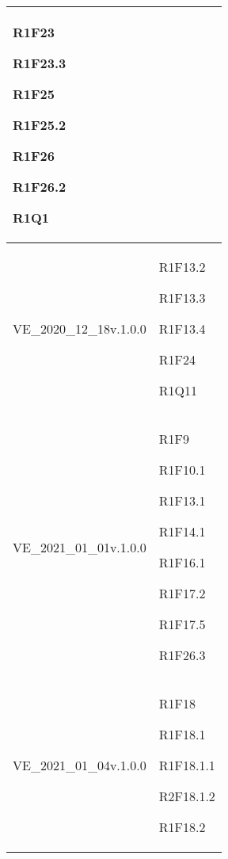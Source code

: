\begin{center}
\begin{longtable}{|p{44mm}|p{22mm}|}
R1F23 \newline

R1F23.3 \newline

R1F25 \newline

R1F25.2 \newline

R1F26 \newline

R1F26.2 \newline

R1Q1 \newline
\\
\hline
VE\_2020\_12\_18v.1.0.0 &

R1F13.2 \newline

R1F13.3 \newline

R1F13.4 \newline

R1F24 \newline

R1Q11 \newline
\\
\hline
VE\_2021\_01\_01v.1.0.0 &

R1F9 \newline

R1F10.1 \newline

R1F13.1 \newline

R1F14.1 \newline

R1F16.1 \newline

R1F17.2 \newline

R1F17.5 \newline

R1F26.3 \newline
\\
\hline
VE\_2021\_01\_04v.1.0.0 &

R1F18 \newline

R1F18.1 \newline

R1F18.1.1 \newline

R2F18.1.2 \newline

R1F18.2 \newline


\end{longtable}
\end{center}
